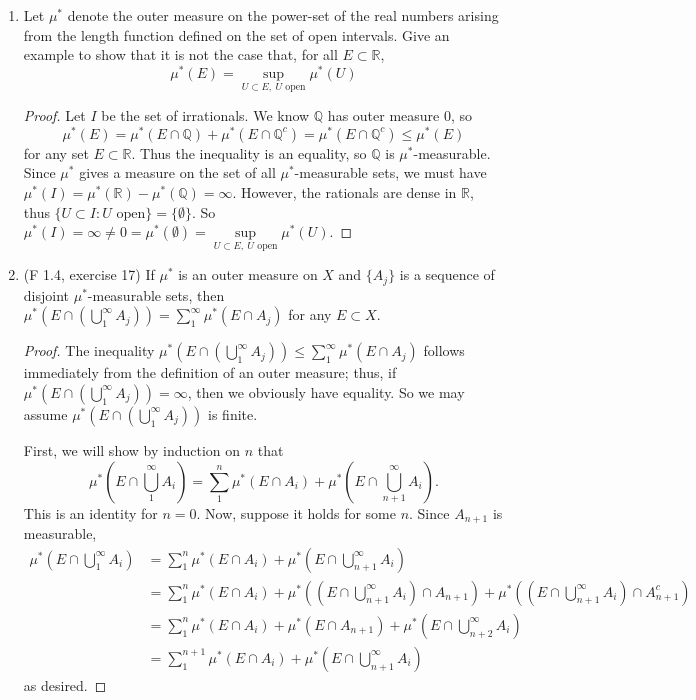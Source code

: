 \documentclass[10pt]{article}
\newcommand{\Q}{\mathbb{Q}}
\newcommand{\R}{\mathbb{R}}
\begin{document}
\begin{enumerate}
\item Let $\mu^*$ denote the outer measure on the power-set of the real numbers arising from the length function defined on the set of open intervals.  Give an example to show that it is not the case that, for all $E \subset \R$,
$$
\mu^*(E) = \sup_{U \subset E, \ U \text{ open}} \mu^*(U)
$$

\begin{proof}
Let $I$ be the set of irrationals.  We know $\Q$ has outer measure $0$, so
$$
\mu^*(E) = \mu^*(E \cap \Q) + \mu^*(E \cap \Q^c) = \mu^*(E \cap \Q^c) \leq \mu^* (E)
$$ for any set $E \subset \R$.  Thus the inequality is an equality, so $\Q$ is $\mu^*$-measurable.  Since $\mu^*$ gives a measure on the set of all $\mu^*$-measurable sets, we must have $\mu^*(I) = \mu^*(\R) - \mu^*(\Q) = \infty$.  However, the rationals are dense in $\R$, thus $\{U \subset I : U \text{ open}\} = \{ \emptyset \}$.  So $\mu^*(I) = \infty \neq 0 = \mu^*(\emptyset) = \sup\limits_{U \subset E, \ U \text{ open}} \mu^*(U)$.
\end{proof}

\item (F 1.4, exercise 17) If $\mu^*$ is an outer measure on $X$ and $\{A_j\}$ is a sequence of disjoint $\mu^*$-measurable sets, then \\$\mu^*(E \cap ( \bigcup_1^\infty A_j)) = \sum_1^\infty \mu^*(E \cap A_j)$ for any $E \subset X$.

\begin{proof}
The inequality $\mu^*(E \cap ( \bigcup_1^\infty A_j)) \leq \sum_1^\infty \mu^*(E \cap A_j)$ follows immediately from the definition of an outer measure; thus, if $\mu^*(E \cap ( \bigcup_1^\infty A_j)) = \infty$, then we obviously have equality.  So we may assume $\mu^*(E \cap ( \bigcup_1^\infty A_j))$ is finite.

First, we will show by induction on $n$ that
$$
\mu^*(E \cap \bigcup_1^\infty A_i) = \sum_1^n \mu^*(E \cap A_i) + \mu^*(E \cap \bigcup_{n+1}^\infty A_i).
$$
This is an identity for $n = 0$.  Now, suppose it holds for some $n$.  Since $A_{n+1}$ is measurable,
\begin{align*}
\mu^*(E \cap \bigcup_1^\infty A_i)
&=
\sum_1^n \mu^*(E \cap A_i) + \mu^*(E \cap \bigcup_{n+1}^\infty A_i) \\
&=
\sum_1^n \mu^*(E \cap A_i) + \mu^*(( E \cap \bigcup_{n+1}^\infty A_i) \cap A_{n+1}) + \mu^*(( E \cap \bigcup_{n+1}^\infty A_i) \cap A_{n+1}^c)
\\
&= \sum_1^n \mu^*(E \cap A_i) + \mu^*( E \cap A_{n+1}) + \mu^*(E \cap \bigcup_{n+2}^\infty A_i)
\\
&= \sum_1^{n+1} \mu^*(E \cap A_i) + \mu^*(E \cap \bigcup_{n+1}^\infty A_i)
\end{align*}
as desired.


\end{proof}
\end{enumerate}
\end{document}
